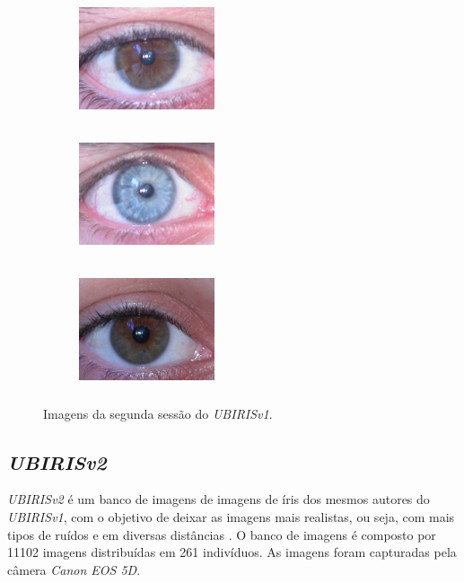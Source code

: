 \begin{figure}[h!]
\begin{subfigure}{.3\textwidth}
\centering
\includegraphics[width=4cm,height=3.5cm]{img/Resultados/ubirisv1/sessao2_1.jpg}
\end{subfigure}\hfill
\begin{subfigure}{.3\textwidth}
\centering
\includegraphics[width=4cm,height=3.5cm]{img/Resultados/ubirisv1/sessao2_55.jpg}
\end{subfigure}\hfill
\begin{subfigure}{.3\textwidth}
\centering
\includegraphics[width=4cm,height=3.5cm]{img/Resultados/ubirisv1/sessao2_76.jpg}
\end{subfigure}
\caption{Imagens da segunda sessão do \textit{UBIRISv1}.}
\label{fig:experimentos:ubirisv1_sessao2}
\end{figure}

\FloatBarrier

\subsection{\textit{UBIRISv2}}\label{sec:experimentos:db:ubirisv2}

\par \textit{UBIRISv2} é um banco de imagens de imagens de íris dos mesmos autores do \textit{UBIRISv1}, com o objetivo de deixar as imagens mais realistas, ou seja, com mais tipos de ruídos e em diversas distâncias \cite{proence2010-ubirisv2}. O banco de imagens é composto por 11102 imagens distribuídas em 261 indivíduos. As imagens foram capturadas pela câmera \textit{Canon EOS 5D}.

